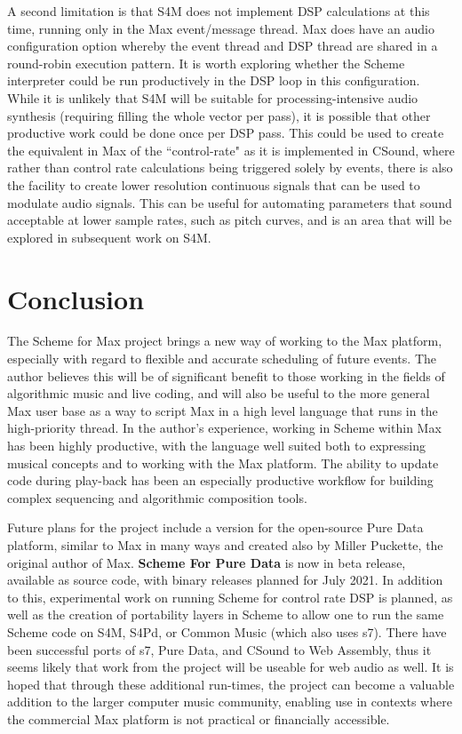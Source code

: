 \documentclass[acmsmall]{acmart}
\begin{document}
A second limitation is that S4M does not implement DSP calculations at this
time, running only in the Max event/message thread. 
Max does have an audio configuration option
whereby the event thread and DSP thread are shared in a round-robin
execution pattern. It is worth exploring whether the Scheme interpreter
could be run productively in the DSP loop in this configuration. While it is
unlikely that S4M will be suitable for processing-intensive audio synthesis
(requiring filling the whole vector per pass), it is possible that
other productive work could be done once per DSP pass.
This could be used to create the equivalent in Max of the ``control-rate"
as it is implemented in CSound, where rather than control rate calculations being triggered
solely by events, there is also the facility to create lower resolution
continuous signals that can be used to modulate audio signals. 
This can be useful for automating parameters that 
sound acceptable at lower sample rates, such as pitch curves, and is
an area that will be explored in subsequent work on S4M.


\section{Conclusion}
The Scheme for Max project brings a new way of working 
to the Max platform, especially with regard to flexible and accurate 
scheduling of future events.  The author believes this will be
of significant benefit to those working in the fields of algorithmic
music and live coding, and will also be useful to the more general Max 
user base as a way to script Max in a high level language that runs in
the high-priority thread. In the author's experience, 
working in Scheme within Max has been highly productive, with the
language well suited both to expressing musical concepts and to working
with the Max platform. The ability to update code during play-back
has been an especially productive workflow for building complex 
sequencing and algorithmic composition tools.

Future plans for the project include a version for the open-source
Pure Data platform, similar to Max in many ways and created also by Miller Puckette,
the original author of Max. \textbf{Scheme For Pure Data} is now in beta release, available
as source code, with binary releases planned for July 2021. In addition
to this, experimental work on running Scheme for control rate DSP is planned,
as well as the creation of portability layers in Scheme to allow one to run 
the same Scheme code on S4M, S4Pd, or Common Music (which also uses s7).
There have been successful ports of s7, Pure Data, and CSound to Web Assembly, 
thus it seems likely that work from the project will be useable for web audio as well.
It is hoped that through these additional run-times, the project can become 
a valuable addition to the larger computer music community, enabling
use in contexts where the commercial Max platform is not practical
or financially accessible.
\end{document}
